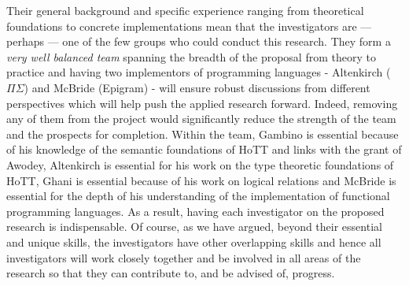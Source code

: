 \documentclass[a4paper,11pt]{article}
\begin{document}
\noindent Their general background and specific experience ranging from
theoretical foundations to concrete implementations mean that the
investigators are --- perhaps --- one of the few groups who could
conduct this research. They form a {\em very well balanced team} spanning
the breadth of the proposal from theory to practice and having two
implementors of programming languages - Altenkirch ($\Pi\Sigma$) and
McBride (Epigram) - will ensure robust discussions from different
perspectives which will help push the applied research forward.
Indeed, removing any of them from the project would significantly
reduce the strength of the team and the prospects for
completion. Within the team, Gambino is essential because of his
knowledge of the semantic foundations of HoTT and links with the grant
of Awodey, Altenkirch is essential for his work on the type theoretic
foundations of HoTT, Ghani is essential because of his work on logical
relations and McBride is essential for the depth of his understanding
of the implementation of functional programming languages.  As a
result, having each investigator on the proposed research is
indispensable. Of course, as we have argued, beyond their essential and unique skills,
the investigators have other overlapping skills and hence all
investigators will work closely together and be involved in all areas
of the research so that they can contribute to, and be advised of,
progress.



\vspace{0.02in}
\end{document}
